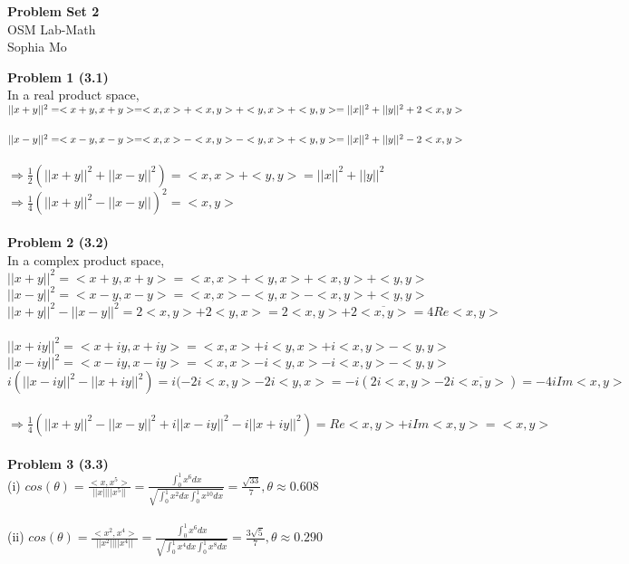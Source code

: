 \documentclass[letterpaper,12pt]{article}
\theoremstyle{definition}
\begin{document}
\begin{flushleft}
  \textbf{\large{Problem Set} 2} \\
  OSM Lab-Math \\
  Sophia Mo
\end{flushleft}

\vspace{5mm}

\noindent\textbf{Problem 1 (3.1)} \\
In a real product space,\\
$||x+y||^2=<x+y, x+y>=<x, x>+<x, y>+<y, x>+<y, y>=\\
||x||^2+||y||^2+2<x, y>$\\
\\
$||x-y||^2=<x-y, x-y>=<x, x>-<x, y>-<y, x>+<y, y>=\\
||x||^2+||y||^2-2<x, y>$\\
\\
$\Rightarrow \frac{1}{2}(||x+y||^2+||x-y||^2)=<x, x>+<y, y>=||x||^2+||y||^2$\\
$\Rightarrow \frac{1}{4}(||x+y||^2-||x-y||)^2=<x,y>$
\\
\\
\noindent\textbf{Problem 2 (3.2)} \\
In a complex product space,\\
$||x+y||^2=<x+y, x+y>=<x, x>+<y, x>+<x, y>+<y, y>$\\
$||x-y||^2=<x-y, x-y>=<x, x>-<y, x>-<x, y>+<y, y>$\\
$||x+y||^2-||x-y||^2=2<x,y>+2<y,x>=2<x,y>+2\overline{<x,y>}=4Re<x,y>$\\
\\
$||x+iy||^2=<x+iy, x+iy>=<x, x>+i<y, x>+i<x, y>-<y, y>$\\
$||x-iy||^2=<x-iy, x-iy>=<x, x>-i<y, x>-i<x, y>-<y, y>$\\
$i(||x-iy||^2-||x+iy||^2)=i(-2i<x,y>-2i<y,x>=-i(2i<x,y>-2i\overline{<x,y>})=-4iIm<x,y>$\\
\\
$\Rightarrow \frac{1}{4}(||x+y||^2-||x-y||^2+i||x-iy||^2-i||x+iy||^2)=Re<x,y>+iIm<x,y>=<x, y>$
\\
\\
\noindent\textbf{Problem 3 (3.3)} \\
(i) $cos(\theta) = \frac{<x, x^5>}{||x||||x^5||}=\frac{\int_0^1 x^6dx}{\sqrt{\int_0^1x^2dx \int_0^1x^{10}dx}}=\frac{\sqrt{33}}{7},  \theta\approx 0.608$\\
\\
(ii) $cos(\theta) = \frac{<x^2, x^4>}{||x^2||||x^4||}=\frac{\int_0^1 x^6dx}{\sqrt{\int_0^1 x^4dx \int_0^1x^8dx}}=\frac{3\sqrt{5}}{7}, \theta \approx 0.290$\\
\end{document}
